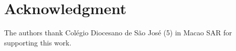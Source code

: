 \documentclass[conference]{IEEEtran}
\begin{document}
\section*{Acknowledgment}

The authors thank Col\'egio Diocesano de S\~ao Jos\'e
(5\textordfeminine) in Macao SAR for supporting this work.



\end{document}
